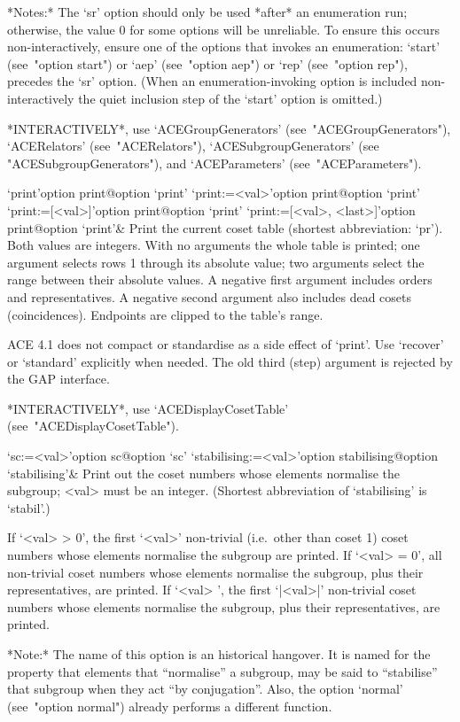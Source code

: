 *Notes:*
The `sr' option should  only  be  used  *after*  an  enumeration  run;
otherwise, the value 0 for some options will be unreliable. To  ensure
this occurs non-interactively, ensure one of the options that  invokes
an enumeration: `start' (see~"option  start")  or  `aep'  (see~"option
aep") or `rep' (see~"option rep"), precedes the `sr' option. (When  an
enumeration-invoking option is included  non-interactively  the  quiet
inclusion step of the `start' option is omitted.)

*INTERACTIVELY*, use `ACEGroupGenerators'  (see~"ACEGroupGenerators"),
`ACERelators'   (see~"ACERelators"),   `ACESubgroupGenerators'    (see
"ACESubgroupGenerators"), and `ACEParameters' (see~"ACEParameters").

\>`print'{option print}@{option `print'}
\>`print:=<val>'{option print}@{option `print'}
\>`print:=[<val>]'{option print}@{option `print'}
\>`print:=[<val>, <last>]'{option print}@{option `print'}&
Print the current coset table (shortest abbreviation: `pr'). Both values
are integers. With no arguments the whole table is printed; one argument
selects rows 1 through its absolute value; two arguments select the range
between their absolute values. A negative first argument includes orders
and representatives. A negative second argument also includes dead cosets
(coincidences). Endpoints are clipped to the table's range.

ACE 4.1 does not compact or standardise as a side effect of `print'.
Use `recover' or `standard' explicitly when needed. The old third (step)
argument is rejected by the GAP interface.

*INTERACTIVELY*,              use               `ACEDisplayCosetTable'
(see~"ACEDisplayCosetTable").

\>`sc:=<val>'{option sc}@{option `sc'}
\>`stabilising:=<val>'{option stabilising}@{option `stabilising'}&
Print out the coset numbers whose elements normalise the subgroup; 
<val> must be an integer.
(Shortest abbreviation of `stabilising' is `stabil'.)

If `<val> > 0', the first `<val>' non-trivial (i.e.~other  than  coset
1) coset numbers whose elements normalise the subgroup are printed. If
`<val> = 0', all non-trivial coset numbers  whose  elements  normalise
the subgroup, plus their representatives, are printed.  If  `<val>  ', the first  `|<val>|'  non-trivial  coset  numbers  whose  elements
normalise the subgroup, plus their representatives, are printed.

*Note:*
The name of this option is an historical hangover. It is named for the
property that elements that ``normalise'' a subgroup, may be  said  to
``stabilise'' that subgroup when they act  ``by  conjugation''.  Also,
the option `normal' (see~"option normal") already performs a different
function.

